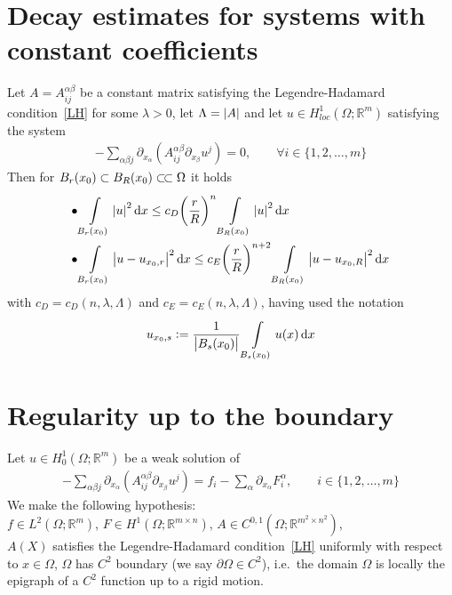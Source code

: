 \section{Decay estimates for systems with constant coefficients}

\begin{lem}[]
	Let \( A=A_{ij}^{\alpha \beta } \) be a constant matrix satisfying the Legendre-Hadamard condition~\eqref{LH} for some \( \lambda > 0 \), let \( \Lambda = \abs{A} \) and let \( u \in  H_{loc}^{1}(\Omega ; \mathbb{R}^{m})  \) satisfying the system
	\begin{gather}
		- \sum\limits_{\alpha \beta j}^{} \partial_{x_{\alpha }} \left( A_{ij}^{\alpha \beta } \partial_{x_{\beta}}  u^{j} \right) = 0, \qquad \forall  i \in \{ 1,2,\ldots , m \}
	\end{gather}
	Then for \( B_{r}(x_{0}) \subset  B_{R}(x_{0}) \ssubset \Omega  \) it holds
	\begin{align}
		\bullet & \int\limits_{B_{r}(x_{0})}^{} \abs{u}^{2} \dd{x} \leq c_{D} {\left( \frac{r}{R} \right)}^{n} \int\limits_{B_{R}(x_{0})}^{} \abs{u}^{2} \dd{x}  \\
		\bullet & \int\limits_{B_{r}(x_{0})}^{} \abs{u-u_{x_{0},r}}^{2} \dd{x} \leq c_{E} {\left( \frac{r}{R} \right)}^{n+2} \int\limits_{B_{R}(x_{0})}^{} \abs{u-u_{x_{0},R}}^{2} \dd{x}
	\end{align}
	with \( c_{D}=c_{D}(n,\lambda, \Lambda  ) \) and \( c_{E}=c_{E}(n, \lambda , \Lambda ) \), having used the notation
	\begin{gather}
		u_{x_{0},s}:= \frac{1}{\abs{B_{s}(x_{0})}} \int\limits_{B_{s}(x_{0})}^{} u(x)  \dd{x}
	\end{gather}
\end{lem}

\section{Regularity up to the boundary}

Let \( u \in H_{0}^{1}(\Omega ; \mathbb{R}^{m})  \) be a weak solution of
\begin{gather}
	- \sum\limits_{\alpha \beta j}^{} \partial_{x_{\alpha }} \left( A_{ij}^{\alpha \beta } \partial_{x_{\beta}}  u^{j} \right) = f_{i} - \sum\limits_{\alpha }^{} \partial_{x_{\alpha }} F_{i}^{\alpha }, \qquad i \in \{ 1,2,\ldots,m \}
\end{gather}
We make the following hypothesis: \\
\( f \in L^{2}(\Omega ; \mathbb{R}^{m}) \), \( F \in H^{1}(\Omega ; \mathbb{R}^{m \times n})  \), \( A \in C^{0,1}(\Omega ; \mathbb{R}^{m^{2}\times n^{2}})  \), \\
\( A(X)  \) satisfies the Legendre-Hadamard condition~\eqref{LH} uniformly with respect to \( x \in \Omega  \), \( \Omega  \) has \( C^{2} \) boundary (we say \( \partial \Omega \in  C^{2} \)), i.e.\ the domain \( \Omega  \) is locally the epigraph of a \( C^{2} \) function up to a rigid motion.

